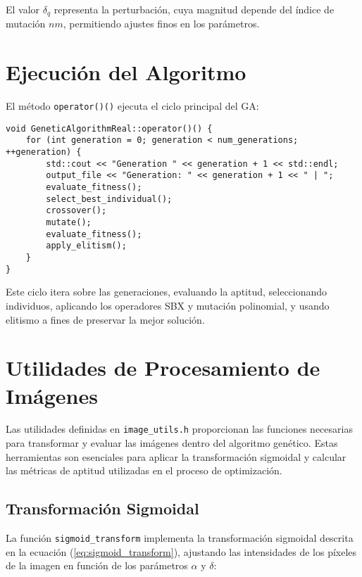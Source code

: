 El valor \(\delta_q\) representa la perturbación, cuya magnitud depende del índice de mutación \(nm\), permitiendo ajustes finos en los parámetros.

\section{Ejecución del Algoritmo}
\label{sec:ejecucion}

El método \texttt{operator()()} ejecuta el ciclo principal del GA:

\begin{lstlisting}[style=cppstyle, caption={Ciclo principal del algoritmo}, label={lst:ga_run}]
void GeneticAlgorithmReal::operator()() {
    for (int generation = 0; generation < num_generations; ++generation) {
        std::cout << "Generation " << generation + 1 << std::endl;
        output_file << "Generation: " << generation + 1 << " | ";
        evaluate_fitness();
        select_best_individual();
        crossover();
        mutate();
        evaluate_fitness();
        apply_elitism();
    }
}
\end{lstlisting}

Este ciclo itera sobre las generaciones, evaluando la aptitud, seleccionando individuos, aplicando los operadores SBX y mutación polinomial,
y usando elitismo a fines de preservar la mejor solución.

\section{Utilidades de Procesamiento de Imágenes}
\label{sec:utilidades}

Las utilidades definidas en \texttt{image\_utils.h} proporcionan las funciones necesarias para transformar y evaluar las imágenes dentro del algoritmo genético. Estas herramientas son esenciales para aplicar la transformación sigmoidal y calcular las métricas de aptitud utilizadas en el proceso de optimización.

\subsection{Transformación Sigmoidal}
\label{subsec:sigmoid_transform}

La función \texttt{sigmoid\_transform} implementa la transformación sigmoidal descrita en la ecuación (\ref{eq:sigmoid_transform}), ajustando las intensidades de los píxeles de la imagen en función de los parámetros \(\alpha\) y \(\delta\):

